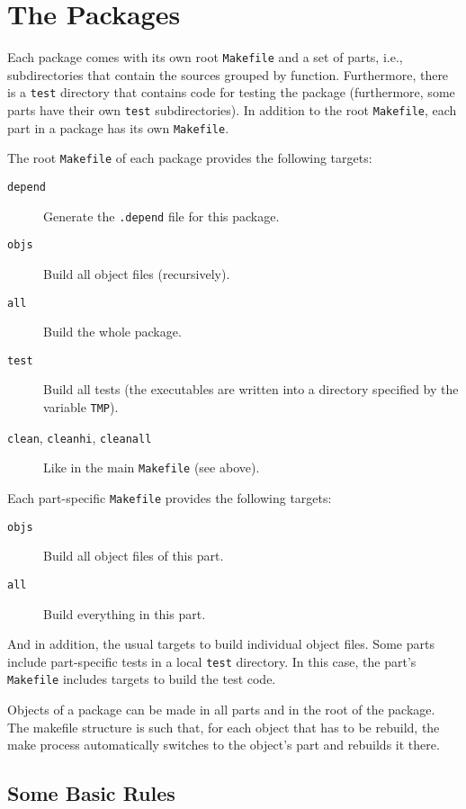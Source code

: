 \documentclass{report}
\newcommand{\code}[1]{\texttt{#1}}
\begin{document}
\section{The Packages}

Each package comes with its own root \code{Makefile} and a set of parts, i.e.,
subdirectories that contain the sources grouped by function.  Furthermore,
there is a \code{test} directory that contains code for testing the package
(furthermore, some parts have their own \code{test} subdirectories).  In
addition to the root \code{Makefile}, each part in a package has its own
\code{Makefile}.

The root \code{Makefile} of each package provides the following targets:
%
\begin{description}
\item[\code{depend}] Generate the \code{.depend} file for this package.
\item[\code{objs}] Build all object files (recursively).
\item[\code{all}] Build the whole package.
\item[\code{test}] Build all tests (the executables are written into a
  directory specified by the variable \code{TMP}).
\item[\code{clean}, \code{cleanhi}, \code{cleanall}] Like in the main
  \code{Makefile} (see above).
\end{description}

Each part-specific \code{Makefile} provides the following targets:
%
\begin{description}
\item[\code{objs}] Build all object files of this part.
\item[\code{all}] Build everything in this part.
\end{description}
%
And in addition, the usual targets to build individual object files.  Some
parts include part-specific tests in a local \code{test} directory.  In this
case, the part's \code{Makefile} includes targets to build the test code.

Objects of a package can be made in all parts and in the root of the package.
The makefile structure is such that, for each object that has to be rebuild,
the make process automatically switches to the object's part and rebuilds it
there.

\subsection{Some Basic Rules}
\end{document}
